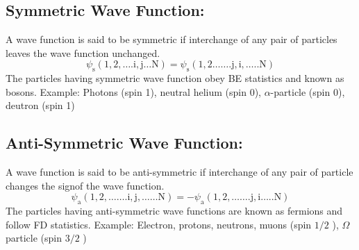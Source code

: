 \subsection{ Symmetric Wave Function:}
A wave function is said to be symmetric if interchange of any pair of particles leaves the wave function unchanged.
$$
\psi_{\mathrm{s}}(1,2, \ldots . \mathrm{i}, \mathrm{j} \ldots \mathrm{N})=\psi_{\mathrm{s}}(1,2 \ldots \ldots . \mathrm{j}, \mathrm{i}, \ldots . . \mathrm{N})
$$
The particles having symmetric wave function obey BE statistics and known as bosons.
Example: Photons (spin 1), neutral helium (spin 0), $\alpha$-particle (spin 0), deutron (spin 1)\\
\subsection{ Anti-Symmetric Wave Function:}
A wave function is said to be anti-symmetric if interchange of any pair of particle changes the signof the wave function.
$$
\psi_{\mathrm{a}}(1,2, \ldots \ldots . \mathrm{i}, \mathrm{j}, \ldots \ldots \mathrm{N})=-\psi_{\mathrm{a}}(1,2, \ldots \ldots . \mathrm{j}, \mathrm{i} \ldots . . \mathrm{N})
$$
The particles having anti-symmetric wave functions are known as fermions and follow FD statistics. Example: Electron, protons, neutrons, muons (spin $1 / 2$ ), $\Omega$ particle (spin $3 / 2$ )
